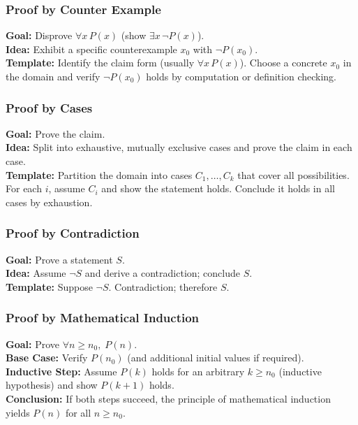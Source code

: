 \documentclass[5pt]{article}
\begin{document}
\begin{multicols}{2}
\subsubsection{Proof by Counter Example}
\textbf{Goal:} Disprove $\forall x\,P(x)$ (show $\exists x\,\lnot P(x)$).\\
\textbf{Idea:} Exhibit a specific counterexample $x_0$ with $\lnot P(x_0)$.\\
\textbf{Template:} Identify the claim form (usually $\forall x\,P(x)$). Choose a concrete $x_0$ in the domain and verify $\lnot P(x_0)$ holds by computation or definition checking.\\

\subsubsection{Proof by Cases}
\textbf{Goal:} Prove the claim.\\
\textbf{Idea:} Split into exhaustive, mutually exclusive cases and prove the claim in each case.\\
\textbf{Template:} Partition the domain into cases $C_1,\dots,C_k$ that cover all possibilities. For each $i$, assume $C_i$ and show the statement holds. Conclude it holds in all cases by exhaustion.\\

\subsubsection{Proof by Contradiction}
\textbf{Goal:} Prove a statement $S$.\\
\textbf{Idea:} Assume $\lnot S$ and derive a contradiction; conclude $S$.\\
\textbf{Template:} Suppose $\lnot S$. \; \;\; Contradiction; therefore $S$.\\

\subsubsection{Proof by Mathematical Induction}
\textbf{Goal:} Prove $\forall n\ge n_0,\;P(n)$.\\
\textbf{Base Case:} Verify $P(n_0)$ (and additional initial values if required).\\
\textbf{Inductive Step:} Assume $P(k)$ holds for an arbitrary $k\ge n_0$ (inductive hypothesis) and show $P(k+1)$ holds.\\
\textbf{Conclusion:} If both steps succeed, the principle of mathematical induction yields $P(n)$ for all $n\ge n_0$.\\


\end{multicols}
\end{document}
